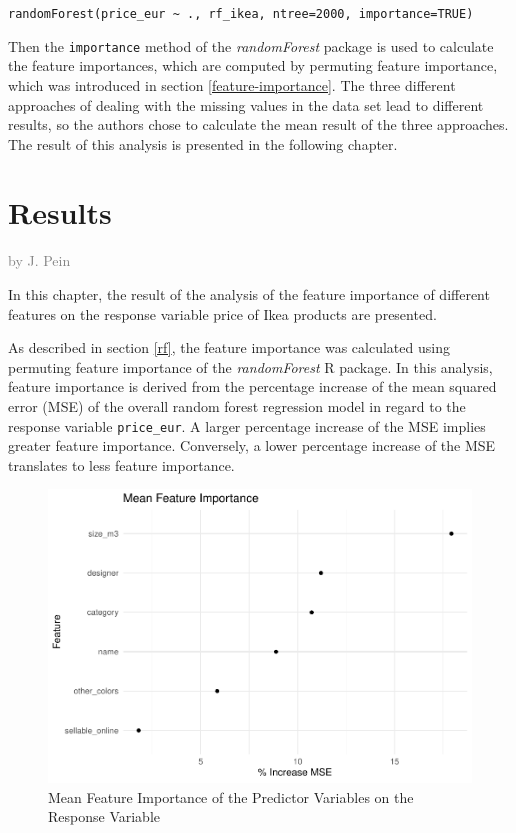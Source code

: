 \documentclass[a4paper, nobind]{templates/ociamthesis}
\begin{document}
\texttt{randomForest(price\_eur\ \textasciitilde{}\ .,\ rf\_ikea,\ ntree=2000,\ importance=TRUE)}

Then the \texttt{importance} method of the \emph{randomForest} package is used to calculate the feature importances, which are computed by permuting feature importance, which was introduced in section \ref{feature-importance}. The three different approaches of dealing with the missing values in the data set lead to different results, so the authors chose to calculate the mean result of the three approaches. The result of this analysis is presented in the following chapter.

\hypertarget{results}{%
\chapter{Results}\label{results}}

\hfill\textcolor{gray}{by J. Pein}

In this chapter, the result of the analysis of the feature importance of different features on the response variable price of Ikea products are presented.

As described in section \ref{rf}, the feature importance was calculated using permuting feature importance of the \emph{randomForest} R package. In this analysis, feature importance is derived from the percentage increase of the mean squared error (MSE) of the overall random forest regression model in regard to the response variable \texttt{price\_eur}. A larger percentage increase of the MSE implies greater feature importance. Conversely, a lower percentage increase of the MSE translates to less feature importance.

\begin{figure}
\includegraphics[width=1\linewidth]{_main_files/figure-latex/mean-feature-importance-1} \caption{Mean Feature Importance of the Predictor Variables on the Response Variable}\label{fig:mean-feature-importance}
\end{figure}
\end{document}
